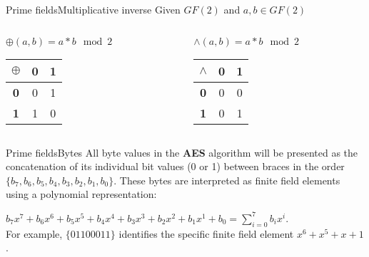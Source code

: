 \begin{frame}[t]{Prime fields}{Multiplicative inverse}
	Given $GF(2)$ and $a, b \in GF(2)$ 
	\bigskip
	\medskip	
	\begin{columns}
		\begin{column}{0.5\textwidth}
			\centering $\oplus(a, b) = a * b \mod 2$		
			\begin{table}[]
				\begin{tabular}{c|cc}
					\textbf{$\oplus$} & \textbf{0} & \textbf{1} \\ \hline
					\textbf{0} & 0         & 1           \\
					\textbf{1} &1          & 0           \\
					      
				\end{tabular}
			\end{table}
		\end{column}
		\begin{column}{0.5\textwidth}  %
			\centering $\wedge(a, b) = a * b \mod 2$	
			\begin{table}[]
				\begin{tabular}{c|cc}
					\textbf{$\wedge$} & \textbf{0} & \textbf{1} \\ \hline
					\textbf{0} & 0          & 0                 \\
					\textbf{1} & 0          & 1                 \\
					        
				\end{tabular}
			\end{table}
		\end{column}
	\end{columns}
\end{frame}

\begin{frame}[t]{Prime fields}{Bytes}
	All byte values in the \textbf{AES} algorithm will be presented as the concatenation of its individual bit values (0 or 1) between braces in the order $\{ b_7, b_6, b_5, b_4, b_3, b_2, b_1, b_0 \}$. These bytes are interpreted as finite field elements using a polynomial representation: \bigskip
	

	$b_7x^7 + b_6x^6 + b_5x^5 + b_4x^4 + b_3x^3 + b_2x^2 + b_1x^1 + b_0 = \sum_{i=0}^{7}b_ix^i$. \\[10pt]


	For example, $\{01100011\}$ identifies the specific finite field element $x^6 + x^5 + x + 1$.
		
\end{frame}


